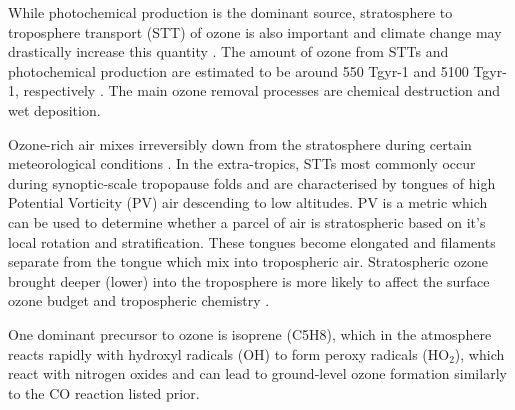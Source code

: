 While photochemical production is the dominant source, stratosphere to troposphere transport (STT) of ozone is also important and climate change may drastically increase this quantity \cite{Hegglin_2009}.
The amount of ozone from STTs and photochemical production are estimated to be around 550 Tgyr-1 and 5100 Tgyr-1, respectively \cite{Stevenson_2006}. 
The main ozone removal processes are chemical destruction and wet deposition.

Ozone-rich air mixes irreversibly down from the stratosphere during certain meteorological conditions \citep{Sprenger2003,Mihalikova2012}.
In the extra-tropics, STTs most commonly occur during synoptic-scale tropopause folds \citep{Sprenger2003} and are characterised by tongues of high Potential Vorticity (PV) air descending to low altitudes.
PV is a metric which can be used to determine whether a parcel of air is stratospheric based on it's local rotation and stratification.
These tongues become elongated and filaments separate from the tongue which mix into tropospheric air.
Stratospheric ozone brought deeper (lower) into the troposphere is more likely to affect the surface ozone budget and tropospheric chemistry \citep{Zanis2003,Langford_2009}.

One dominant precursor to ozone is isoprene (C5H8), which in the atmosphere reacts rapidly with hydroxyl radicals (OH) to form peroxy radicals (HO$_2$), which react with nitrogen oxides and can lead to ground-level ozone formation similarly to the CO reaction listed prior.

  